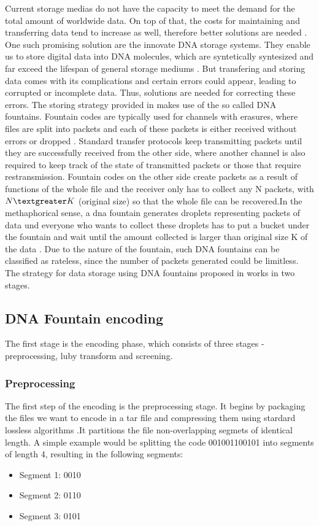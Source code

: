 \documentclass[12pt]%
{article}
\begin{document}
Current storage medias do not have the capacity to meet the demand for the total amount of worldwide data. On top of that, the costs for maintaining and transferring data tend to increase as well, therefore better solutions are needed \cite{dong2020dna}. One such promising solution are the innovate DNA storage systems. They enable us to store digital data into DNA molecules, which are syntetically syntesized and far exceed the lifespan of general storage mediums \cite{dong2020dna}. But transfering and storing data comes with its complications and certain errors could appear, leading to corrupted or incomplete data. Thus, solutions are needed for correcting these errors. The storing strategy provided in \cite{erlich2017dna} makes use of the so called DNA fountains. Fountain codes are typically used for channels with erasures, where files are split into packets and each of these packets is either received without errors or dropped \cite{mackay2005fountain}.  Standard transfer protocols keep transmitting packets until they are successfully received from the other side, where another channel is also required to keep track of the state of transmitted packets or those that require restransmission. Fountain codes on the other side create packets as a result of functions of the whole file and the receiver only has to collect any N packets, with $N \textgreater K$ (original size) so that the whole file can be recovered.In the methaphorical sense, a dna fountain generates droplets representing packets of data und everyone who wants to collect these droplets has to put a bucket under the fountain and wait until the amount collected is larger than original size K of the data \cite{mackay2005fountain}. Due to the nature of the fountain, such DNA fountains can be classified as rateless, since the number of packets generated could be limitless.
The strategy for data storage using DNA fountains proposed in \cite{erlich2017dna} works in two stages. 

\subsection{DNA Fountain encoding}

The first stage is the encoding phase, which consists of three stages - preprocessing, luby transform and screening.

\subsubsection{Preprocessing}  
The first step of the encoding is the preprocessing stage. It begins by packaging the files we want to encode in a tar file and compressing them using stardard lossless algorithms \cite{erlich2017dnasupplementary}.It partitions the file non-overlapping segmets of identical length. A simple example would be splitting the code 001001100101 into segments of length 4, resulting in the following segments:
\begin{itemize}
\item Segment 1: 0010
\item Segment 2: 0110
\item Segment 3: 0101
\end{itemize}
\end{document}
